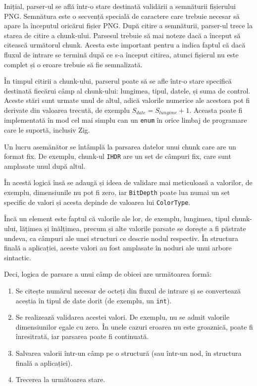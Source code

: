 \documentclass[a4paper,12pt]{report}
\begin{document}
Inițial, parser-ul se află într-o stare destinată validării a semnăturii fișierului \ac{PNG}.
Semnătura este o secvență specială de caractere care 
trebuie necesar să apare la începutul oricărui fișier \ac{PNG}.
După citire a semnăturii, parser-ul trece la starea de citire a chunk-ului.
Parsesul trebuie să mai noteze dacă a început să citească următorul chunk.
Acesta este important pentru a indica faptul că dacă fluxul de intrare
se termină după ce s-a început citirea, atunci fișierul nu este complet și 
o eroare trebuie să fie semnalizată.

În timpul citirii a chunk-ului, parserul poate să se afle 
într-o stare specifică destinată fiecărui câmp al chunk-ului:
lungimea, tipul, datele, și suma de control.
Aceste stări sunt urmate unul de altul, adică valorile numerice
ale acestora pot fi derivate din valoarea trecută, de exemplu 
$ S_{date} = S_{lungime} + 1. $
Aceasta poate fi implementată în mod cel mai simplu can un \texttt{enum}
în orice limbaj de programare care le suportă, inclusiv Zig.

Un lucru asemănător se întâmplă la parsarea datelor unui chunk care are un format fix.
De exemplu, chunk-ul \texttt{IHDR} are un set de câmpuri fix, care sunt amplasate unul după altul.

În acestă logică însă se adaugă și ideea de validare mai meticuloasă a valorilor,
de exemplu, dimensiunile nu pot fi zero, iar \texttt{BitDepth} poate lua numai un set specific de valori
și acesta depinde de valoarea lui \texttt{ColorType}.

Încă un element este faptul că valorile ale lor, de exemplu, lungimea, tipul chunk-ului,
lățimea și înălțimea, precum și alte valorile parsate se dorește a fi păstrate undeva,
ca câmpuri ale unei structuri ce descrie nodul respectiv.
În structura finală a aplicației, aceste valori au fost amplasate în noduri ale unui arbore sintactic.

Deci, logica de parsare a unui câmp de obicei are următoarea formă:
\begin{enumerate}
\item
    Se citește numărul necesar de octeți din fluxul de intrare
        și se convertează aceștia în tipul de date dorit (de exemplu, un \texttt{int}).
\item
    Se realizează validarea acestei valori.
    De exemplu, nu se admit valorile dimensiunilor egale cu zero.
    În unele cazuri eroarea nu este groaznică, poate fi înresitrată, iar parsarea poate fi continuată.
\item
    Salvarea valorii într-un câmp pe o structură (sau într-un nod, în structura finală a aplicației).
\item
    Trecerea la următoarea stare.
\end{enumerate}
\end{document}
